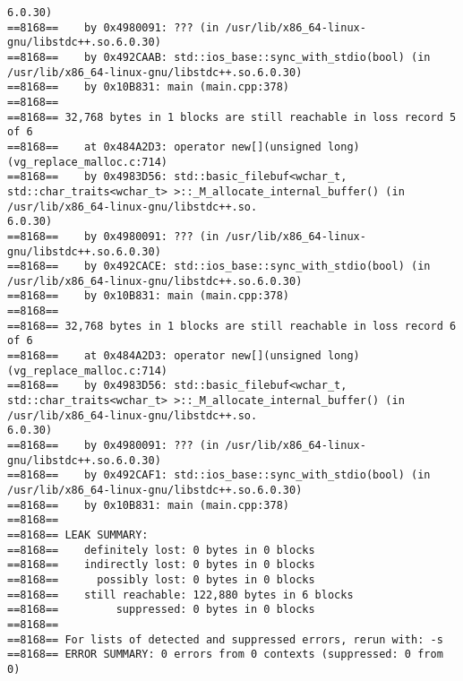 \begin{Verbatim}[breaklines=true]
6.0.30)
==8168==    by 0x4980091: ??? (in /usr/lib/x86_64-linux-gnu/libstdc++.so.6.0.30)
==8168==    by 0x492CAAB: std::ios_base::sync_with_stdio(bool) (in /usr/lib/x86_64-linux-gnu/libstdc++.so.6.0.30)
==8168==    by 0x10B831: main (main.cpp:378)
==8168== 
==8168== 32,768 bytes in 1 blocks are still reachable in loss record 5 of 6
==8168==    at 0x484A2D3: operator new[](unsigned long) (vg_replace_malloc.c:714)
==8168==    by 0x4983D56: std::basic_filebuf<wchar_t, std::char_traits<wchar_t> >::_M_allocate_internal_buffer() (in /usr/lib/x86_64-linux-gnu/libstdc++.so.
6.0.30)
==8168==    by 0x4980091: ??? (in /usr/lib/x86_64-linux-gnu/libstdc++.so.6.0.30)
==8168==    by 0x492CACE: std::ios_base::sync_with_stdio(bool) (in /usr/lib/x86_64-linux-gnu/libstdc++.so.6.0.30)
==8168==    by 0x10B831: main (main.cpp:378)
==8168== 
==8168== 32,768 bytes in 1 blocks are still reachable in loss record 6 of 6
==8168==    at 0x484A2D3: operator new[](unsigned long) (vg_replace_malloc.c:714)
==8168==    by 0x4983D56: std::basic_filebuf<wchar_t, std::char_traits<wchar_t> >::_M_allocate_internal_buffer() (in /usr/lib/x86_64-linux-gnu/libstdc++.so.
6.0.30)
==8168==    by 0x4980091: ??? (in /usr/lib/x86_64-linux-gnu/libstdc++.so.6.0.30)
==8168==    by 0x492CAF1: std::ios_base::sync_with_stdio(bool) (in /usr/lib/x86_64-linux-gnu/libstdc++.so.6.0.30)
==8168==    by 0x10B831: main (main.cpp:378)
==8168== 
==8168== LEAK SUMMARY:
==8168==    definitely lost: 0 bytes in 0 blocks
==8168==    indirectly lost: 0 bytes in 0 blocks
==8168==      possibly lost: 0 bytes in 0 blocks
==8168==    still reachable: 122,880 bytes in 6 blocks
==8168==         suppressed: 0 bytes in 0 blocks
==8168== 
==8168== For lists of detected and suppressed errors, rerun with: -s
==8168== ERROR SUMMARY: 0 errors from 0 contexts (suppressed: 0 from 0)
\end{Verbatim}
\pagebreak

